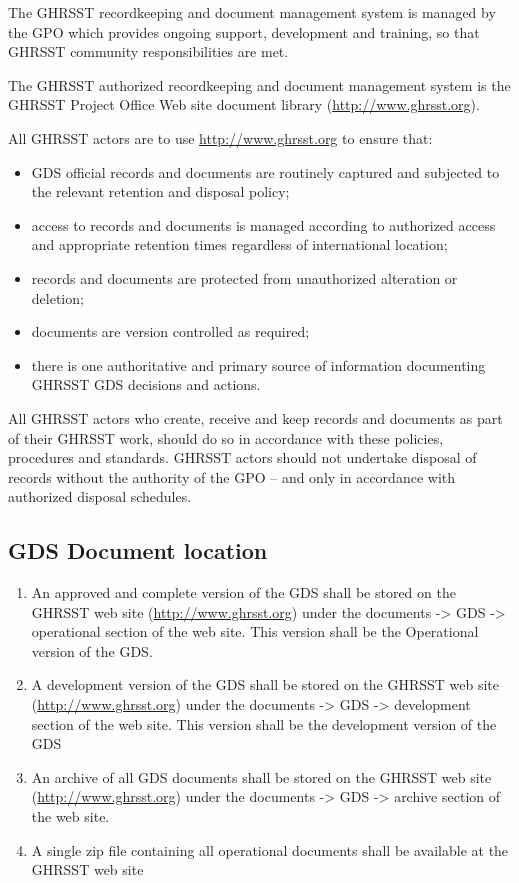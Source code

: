 The GHRSST recordkeeping and document management system is managed by the GPO which
provides ongoing support, development and training, so that GHRSST community responsibilities are met.
\newp

The GHRSST authorized recordkeeping and document management system is the GHRSST Project
Office Web site document library (\url{http://www.ghrsst.org}).
\newp

All GHRSST actors are to use \url{http://www.ghrsst.org} to ensure that:
\begin{itemize}[noitemsep]
    \item GDS official records and documents are routinely captured and subjected to the relevant retention and disposal policy;
    \item access to records and documents is managed according to authorized access and appropriate retention times regardless of international location;
    \item records and documents are protected from unauthorized alteration or deletion;
    \item documents are version controlled as required;
    \item there is one authoritative and primary source of information documenting GHRSST GDS decisions and actions.
\end{itemize}
\newp

All GHRSST actors who create, receive and keep records and documents as part of their GHRSST
work, should do so in accordance with these policies, procedures and standards. GHRSST actors
should not undertake disposal of records without the authority of the GPO – and only in accordance
with authorized disposal schedules.

\subsection{GDS Document location}
\begin{enumerate}[noitemsep]
    \item An approved and complete version of the GDS shall be stored on the GHRSST web site (\url{http://www.ghrsst.org}) under the documents -> GDS -> operational section of the web site. This version shall be the Operational version of the GDS.
    \item A development version of the GDS shall be stored on the GHRSST web site (\url{http://www.ghrsst.org}) under the documents -> GDS -> development section of the web site. This version shall be the development version of the GDS
    \item An archive of all GDS documents shall be stored on the GHRSST web site (\url{http://www.ghrsst.org}) under the documents -> GDS -> archive section of the web site.
    \item A single zip file containing all operational documents shall be available at the GHRSST web site
\end{enumerate}

